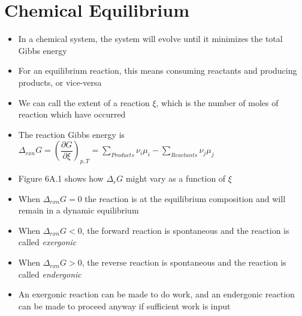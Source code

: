 \documentclass[12pt, openany, letterpaper]{memoir}
\begin{document}
\chapter{Chemical Equilibrium}
\begin{itemize}
	\item In a chemical system, the system will evolve until it minimizes the total Gibbs energy
	\item For an equilibrium reaction, this means consuming reactants and producing products, or vice-versa
	\item We can call the extent of a reaction $\xi$, which is the number of moles of reaction which have occurred
	\item The reaction Gibbs energy is $\Delta_{rxn}G=\left(\dfrac{\partial G}{\partial \xi}\right)_{p,T} = \displaystyle\sum\limits_{Products}\nu_i\mu_i - \displaystyle\sum\limits_{Reactants}\nu_j\mu_j$ 
	\item Figure 6A.1 shows how $\Delta_{r}G$ might vary as a function of $\xi$
	\item When $\Delta_{rxn}G=0$ the reaction is at the equilibrium composition and will remain in a dynamic equilibrium
	\item When $\Delta_{rxn}G<0$, the forward reaction is spontaneous and the reaction is called \emph{exergonic}
	\item When $\Delta_{rxn}G>0$, the reverse reaction is spontaneous and the reaction is called \emph{endergonic}
	\item An exergonic reaction can be made to do work, and an endergonic reaction can be made to proceed anyway if sufficient work is input
\end{itemize}
\end{document}
